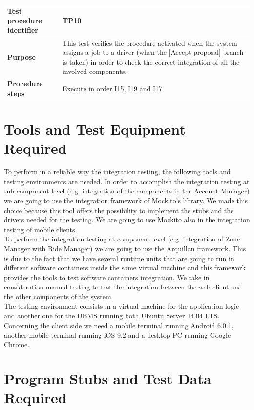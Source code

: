 \documentclass[a4paper,11pt]{report} %
\begin{document}
				\begin{center}
					\begin{tabular}{| l | p{9.5cm} |}\hline
						\textbf{Test procedure identifier} & TP10\\\hline
						\textbf{Purpose} & This test verifies the procedure activated when the system assigns a job to a driver (when the [Accept proposal] branch is taken) in order to check the correct integration of all the involved components.\\\hline
						\textbf{Procedure steps} & Execute in order I15, I19 and I17 \\\hline
					\end{tabular}
				\end{center}																																					
									

	
	\section{Tools and Test Equipment Required}
		To perform in a reliable way the integration testing, the following tools and testing environments are needed.
		In order to accomplish the integration testing at sub-component level (e.g. integration of the components in the Account Manager) we are going to use the integration framework of Mockito's library. We made this choice because this tool offers the possibility to implement the stubs and the drivers needed for the testing. We are going to use Mockito also in the integration testing of mobile clients.\\
		To perform the integration testing at component level (e.g. integration of Zone Manager with Ride Manager) we are going to use the Arquillan framework. This is due to the fact that we have several runtime units that are going to run in different software containers inside the same virtual machine and this framework provides the tools to test software containers integration.
		We take in consideration manual testing to test the integration between the web client and the other components of the system.\\
		The testing environment consists in a virtual machine for the application logic and another one for the DBMS running both Ubuntu Server 14.04 LTS. Concerning the client side we need a mobile terminal running Android  6.0.1, another mobile terminal running iOS 9.2 and a desktop PC running Google Chrome.
	
	\pagebreak
	\section{Program Stubs and Test Data Required}
\end{document}
